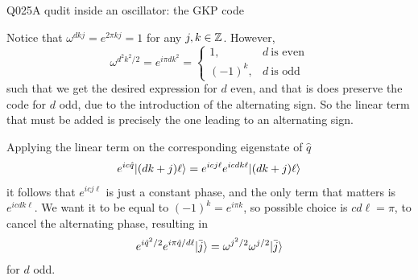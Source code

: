 \begin{entry}{Q025}{A qudit inside an oscillator: the GKP code}
\begin{solution}[Part (d)]
Notice that $\omega^{dk j}=e^{2\pi k j}=1$ for any $j,k \in \mathbb{Z}$. However, 
\begin{equation}
    \omega^{d^2k^2/2}=e^{i\pi d k^2} =\begin{cases}
        1, & d\ \text{is even}\\
        (-1)^k,& d\ \text{is odd} 
    \end{cases}
\end{equation}
such that we get the desired expression for $d$ even, and that is does preserve the code for $d$ odd, due to the introduction of the alternating sign. So the linear term that must be added is precisely the one leading to an alternating sign.

Applying the linear term on the corresponding eigenstate of $\hat q$
\begin{equation}
    e^{ic\hat q} \lvert (dk+j)\ell \rangle =  e^{icj\ell} e^{icdk\ell}  \lvert (dk+j)\ell \rangle
\end{equation}
it follows that $e^{icj\ell}$ is just a constant phase, and the only term that matters is $e^{icdk\ell}$. We want it to be equal to $(-1)^k=e^{i\pi k}$, so possible choice is $cd\ell=\pi$, to cancel the alternating phase, resulting in 
\begin{equation}
    e^{i\hat q^2/2} e^{i\pi \hat q /d\ell} \lvert \bar j \rangle = \omega^{j^2/2} \omega^{j/2} \lvert \bar j \rangle 
\end{equation}
for $d$ odd.

\end{solution}




\begin{takeaway}
\end{takeaway}


\end{entry}